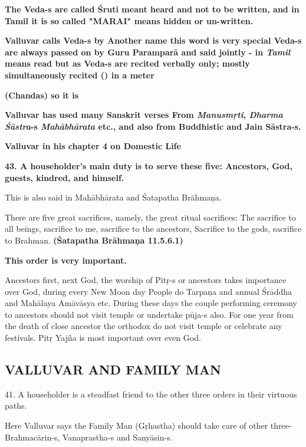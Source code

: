 \textbf{The Veda-s are called Śruti meant heard and not to be written, and in Tamil it is so called "MARAI" means hidden or un-written.}

\textbf{Valluvar calls Veda-s by Another name  this word is very special Veda-s are always passed on by Guru Paramparā and said jointly - in \textit{Tamil}  means read but as Veda-s are recited verbally only; mostly simultaneously recited () in a meter}

\textbf{(Chandas) so it is }

\textbf{Valluvar has used many Sanskrit verses From \textit{Manusmŗti}, \textit{Dharma Śāstra}-s \textit{Mahābhārata} etc., and also from Buddhistic and Jain Sāstra-s.}

\textbf{Valluvar in his chapter 4 on Domestic Life}

\textbf{43. A householder's main duty is to serve these five: Ancestors, God, guests, kindred, and himself.}

This is also said in Mahābhārata and Śatapatha Brāhmaņa.

There are five great sacrifices, namely, the great ritual sacrifices: The sacrifice to all beings, sacrifice to me, sacrifice to the ancestors, Sacrifice to the gods, sacrifice to Brahman. \textbf{(Śatapatha Brāhmaņa 11.5.6.1)}

\textbf{This order is very important.}

Ancestors first, next God, the worship of Pitŗ-s or ancestors takes importance over God, during every New Moon day People do Tarpaņa and annual Śrāddha and Mahālaya Amāvāsya etc. During these days the couple performing ceremony to ancestors should not visit temple or undertake pūja-s also. For one year from the death of close ancestor the orthodox do not visit temple or celebrate any festivals. Pitŗ Yajña is most important over even God.


\subsection*{VALLUVAR AND FAMILY MAN}

41. A householder is a steadfast friend to the other three orders in their virtuous paths.

Here Valluvar says the Family Man (Gŗhastha) should take care of other three- Brahmacārin-s, Vanaprastha-s and Sanyāsin-s.

